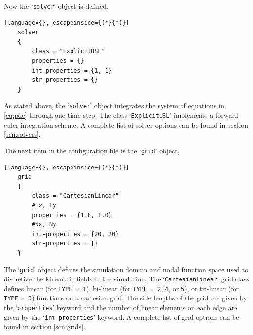 Now the `\texttt{solver}' object is defined,
\begin{lstlisting}[language={}, escapeinside={(*}{*)}]
    solver
    {
        class = "ExplicitUSL"
        properties = {}
        int-properties = {1, 1}
        str-properties = {}
    }
\end{lstlisting}
As stated above, the `\texttt{solver}' object integrates the system of equations in \eqref{eq:pde} through one time-step. The class `\texttt{ExplicitUSL}' implements a forward euler integration scheme. A complete list of solver options can be found in section \ref{scn:solvers}.

The next item in the configuration file is the `\texttt{grid}' object,
\begin{lstlisting}[language={}, escapeinside={(*}{*)}]
    grid
    {
        class = "CartesianLinear"
        #Lx, Ly
        properties = {1.0, 1.0}
        #Nx, Ny
        int-properties = {20, 20}
        str-properties = {}
    }
\end{lstlisting}
The `\texttt{grid}' object defines the simulation domain and nodal function space used to discretize the kinematic fields in the simulation. The `\texttt{CartesianLinear}' grid class defines linear (for \texttt{TYPE = 1}), bi-linear (for \texttt{TYPE = 2}, \texttt{4}, or \texttt{5}), or tri-linear (for \texttt{TYPE = 3}) functions on a cartesian grid. The side lengths of the grid are given by the `\texttt{properties}' keyword and the number of linear elements on each edge are given by the `\texttt{int-properties}' keyword. A complete list of grid options can be found in section \ref{scn:grids}.

